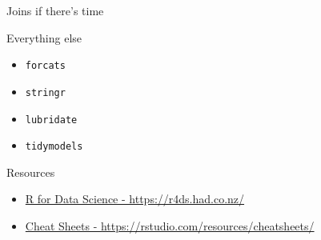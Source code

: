 \documentclass[
  ignorenonframetext,
]{beamer}
\providecommand{\tightlist}{%
  \setlength{\itemsep}{0pt}\setlength{\parskip}{0pt}}
\begin{document}
\begin{frame}{Joins if there's time}
\protect\hypertarget{joins-if-theres-time}{}
\end{frame}

\begin{frame}[fragile]{Everything else}
\protect\hypertarget{everything-else}{}
\begin{itemize}
\tightlist
\item
  \texttt{forcats}
\item
  \texttt{stringr}
\item
  \texttt{lubridate}
\item
  \texttt{tidymodels}
\end{itemize}
\end{frame}

\begin{frame}{Resources}
\protect\hypertarget{resources}{}
\begin{itemize}
\tightlist
\item
  \href{https://r4ds.had.co.nz/}{R for Data Science -
  https://r4ds.had.co.nz/}
\item
  \href{https://rstudio.com/resources/cheatsheets/}{Cheat Sheets -
  https://rstudio.com/resources/cheatsheets/}
\end{itemize}
\end{frame}
\end{document}
